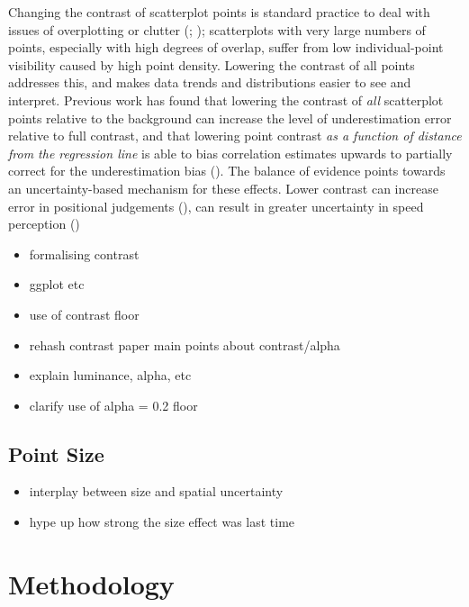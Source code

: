 \documentclass[manuscript, review, anonymous, screen]{acmart}
\providecommand{\tightlist}{%
  \setlength{\itemsep}{0pt}\setlength{\parskip}{0pt}}\usepackage{longtable,booktabs,array}
\begin{document}
Changing the contrast of scatterplot points is standard practice to deal
with issues of overplotting or clutter (\citet{matejka_2015};
\citet{bertini_2004}); scatterplots with very large numbers of points,
especially with high degrees of overlap, suffer from low
individual-point visibility caused by high point density. Lowering the
contrast of all points addresses this, and makes data trends and
distributions easier to see and interpret. Previous work has found that
lowering the contrast of \emph{all} scatterplot points relative to the
background can increase the level of underestimation error relative to
full contrast, and that lowering point contrast \emph{as a function of
distance from the regression line} is able to bias correlation estimates
upwards to partially correct for the underestimation bias
(\citet{strain_2023}). The balance of evidence points towards an
uncertainty-based mechanism for these effects. Lower contrast can
increase error in positional judgements (\citet{wehrhahn_1990}), can
result in greater uncertainty in speed perception
(\citet{champion_2017})

\begin{itemize}
\item
  formalising contrast
\item
  ggplot etc
\item
  use of contrast floor
\item
  rehash contrast paper main points about contrast/alpha
\item
  explain luminance, alpha, etc
\item
  clarify use of alpha = 0.2 floor
\end{itemize}

\hypertarget{sec-point-size}{%
\subsection{Point Size}\label{sec-point-size}}

\begin{itemize}
\tightlist
\item
  interplay between size and spatial uncertainty
\item
  hype up how strong the size effect was last time
\end{itemize}

\hypertarget{sec-methods}{%
\section{Methodology}\label{sec-methods}}
\end{document}
